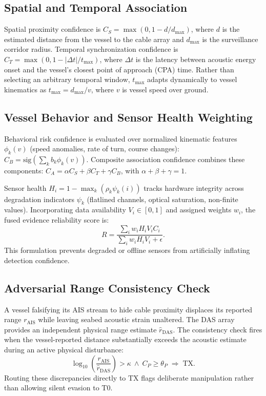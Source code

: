 \documentclass[conference]{IEEEtran}
\newcommand{\dstate}[1]{\ensuremath{\mathrm{#1}}}
\begin{document}
\subsection{Spatial and Temporal Association}
Spatial proximity confidence is $C_S = \max(0, 1 - d/d_{\max})$, where $d$ is the estimated distance from the vessel to the cable array and $d_{\max}$ is the surveillance corridor radius. Temporal synchronization confidence is $C_T = \max(0, 1 - |\Delta t| / t_{\max})$, where $\Delta t$ is the latency between acoustic energy onset and the vessel's closest point of approach (CPA) time. Rather than selecting an arbitrary temporal window, $t_{\max}$ adapts dynamically to vessel kinematics as $t_{\max} = d_{\max} / v$, where $v$ is vessel speed over ground.

\subsection{Vessel Behavior and Sensor Health Weighting}
Behavioral risk confidence is evaluated over normalized kinematic features $\phi_k(v)$ (speed anomalies, rate of turn, course changes): $C_B = \mathrm{sig}\!\left(\sum_k b_k \phi_k(v)\right)$. Composite association confidence combines these components: $C_A = \alpha C_S + \beta C_T + \gamma C_B$, with $\alpha + \beta + \gamma = 1$.

Sensor health $H_i = 1 - \max_k(\rho_k \psi_k(i))$ tracks hardware integrity across degradation indicators $\psi_k$ (flatlined channels, optical saturation, non-finite values). Incorporating data availability $V_i \in [0, 1]$ and assigned weights $w_i$, the fused evidence reliability score is:
\begin{equation}
R = \frac{\sum_i w_i H_i V_i C_i}{\sum_i w_i H_i V_i + \epsilon}.
\end{equation}
This formulation prevents degraded or offline sensors from artificially inflating detection confidence.

\subsection{Adversarial Range Consistency Check}
A vessel falsifying its AIS stream to hide cable proximity displaces its reported range $r_{\mathrm{AIS}}$ while leaving seabed acoustic strain unaltered. The DAS array provides an independent physical range estimate $\hat{r}_{\mathrm{DAS}}$. The consistency check fires when the vessel-reported distance substantially exceeds the acoustic estimate during an active physical disturbance:
\begin{equation}
\log_{10}\!\left(\frac{r_{\mathrm{AIS}}}{\hat{r}_{\mathrm{DAS}}}\right) > \kappa
\ \wedge\ C_P \geq \theta_P \;\Rightarrow\; \dstate{TX}.
\label{eq:consistency}
\end{equation}
Routing these discrepancies directly to \dstate{TX} flags deliberate manipulation rather than allowing silent evasion to \dstate{T0}.
\end{document}
